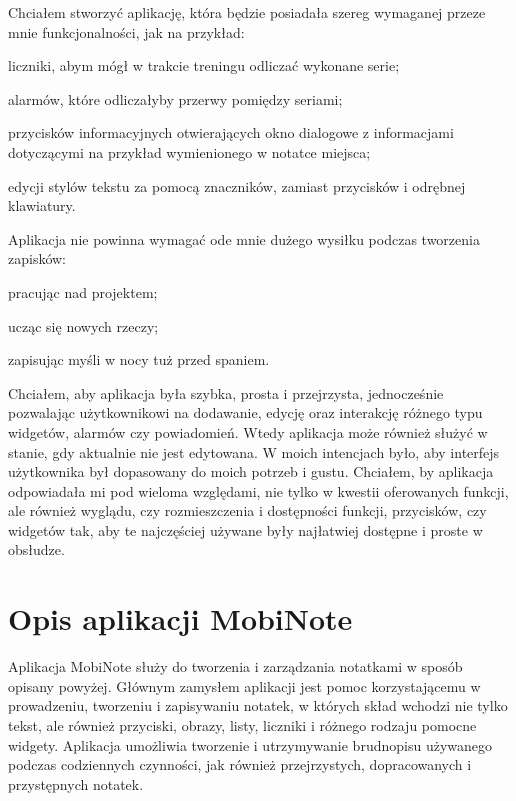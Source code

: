 \documentclass[shortabstract]{iithesis}
\begin{document}
Chciałem stworzyć aplikację, która będzie posiadała szereg wymaganej przeze mnie funkcjonalności, jak na przykład:
\begin{compactitem}
    \item liczniki, abym mógł w trakcie treningu odliczać wykonane serie;
    \item alarmów, które odliczałyby przerwy pomiędzy seriami;
    \item przycisków informacyjnych otwierających okno dialogowe z informacjami dotyczącymi na przykład wymienionego w notatce miejsca;
    \item edycji stylów tekstu za pomocą znaczników, zamiast przycisków i odrębnej klawiatury. 
\end{compactitem}
Aplikacja nie powinna wymagać ode mnie dużego wysiłku podczas tworzenia zapisków: 
\begin{compactitem}
    \item pracując nad projektem;
    \item ucząc się nowych rzeczy;
    \item zapisując myśli w nocy tuż przed spaniem.
\end{compactitem}
Chciałem, aby aplikacja była szybka, prosta i przejrzysta, jednocześnie pozwalając użytkownikowi na dodawanie, edycję oraz interakcję różnego typu widgetów, alarmów czy powiadomień. Wtedy aplikacja może również służyć w stanie, gdy aktualnie nie jest edytowana. W moich intencjach było, aby interfejs użytkownika był dopasowany do moich potrzeb i gustu. Chciałem, by aplikacja odpowiadała mi pod wieloma względami, nie tylko w kwestii oferowanych funkcji, ale również wyglądu, czy rozmieszczenia i dostępności funkcji, przycisków, czy widgetów tak, aby te najczęściej używane były najłatwiej dostępne i proste w obsłudze.

\section{Opis aplikacji MobiNote}

Aplikacja MobiNote służy do tworzenia i zarządzania notatkami w sposób opisany powyżej.
Głównym zamysłem aplikacji jest pomoc korzystającemu w prowadzeniu, tworzeniu i zapisywaniu notatek, w których skład wchodzi nie tylko tekst, ale również przyciski, obrazy, listy, liczniki i różnego rodzaju pomocne widgety.
Aplikacja umożliwia tworzenie i utrzymywanie brudnopisu używanego podczas codziennych czynności, jak również przejrzystych, dopracowanych i przystępnych  notatek.
\end{document}

